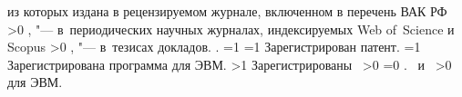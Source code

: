{\begin{refsection}
             из которых издана в рецензируемом журнале, включенном в перечень ВАК РФ%
        \ifnum \value{citeauthorscopuswos}>0%
            ,  "--- в~периодических научных журналах, индексируемых Web of~Science и Scopus%
        \fi%
        \ifnum \value{citeauthorconf}>0%
            ,  "--- в~тезисах докладов.
        \else%
            .
        \fi%
        \ifnum \value{citeregistered}=1%
            \ifnum \value{citeauthorpatent}=1%
                Зарегистрирован  патент.
            \fi%
            \ifnum \value{citeauthorprogram}=1%
                Зарегистрирована  программа для ЭВМ.
            \fi%
        \fi%
        \ifnum \value{citeregistered}>1%
            Зарегистрированы\ %
            \ifnum \value{citeauthorpatent}>0%
                \ifnum \value{citeauthorprogram}=0 . \else \ и~\fi%
            \fi%
            \ifnum \value{citeauthorprogram}>0%
                 для ЭВМ.
            \fi%
        \fi%
    \end{refsection}%
    \begin{refsection}
    \end{refsection}%
}


